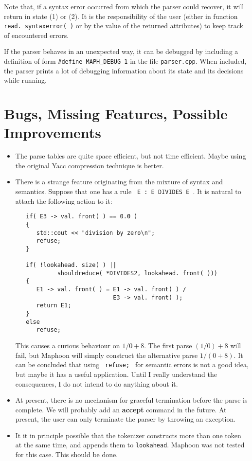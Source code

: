 \documentclass{article}
\begin{document}
\noindent
Note that, if a syntax error occurred from which the parser could
recover, it will return in state (1) or (2). It is the responsibility
of the user (either in function \verb+read. syntaxerror( )+ or by
the value of the returned attributes) to keep track
of encountered errors.

If the parser behaves in an unexpected way, it can be
debugged by including a definition of form
\verb+#define MAPH_DEBUG 1+ in the file
\verb+parser.cpp+. 
When included, the parser prints a lot of debugging information
about its state and its decisions while running.

\section{Bugs, Missing Features, Possible Improvements}

\begin{itemize}
\item  
   The parse tables are quite space efficient, but not time efficient.
   Maybe using the original Yacc compression technique is better.
\item
   There is a strange feature originating from the mixture of syntax
   and semantics. Suppose that one has a rule 
   \verb+ E : E DIVIDES E +. It is natural to attach the following
   action to it:

\begin{verbatim}
   if( E3 -> val. front( ) == 0.0 )
   {
      std::cout << "division by zero\n";
      refuse;
   }

   if( !lookahead. size( ) || 
            shouldreduce( *DIVIDES2, lookahead. front( )))
   {
      E1 -> val. front( ) = E1 -> val. front( ) / 
                            E3 -> val. front( );
      return E1;
   }
   else
      refuse;
\end{verbatim}

   \noindent
   This causes a curious behaviour on $ 1 / 0 + 8. $ 
   The first parse $ (1/0)+8 $ will fail, but Maphoon will simply construct
   the alternative parse $ 1 / ( 0 + 8 ). $ 
   It can be concluded that using \verb+ refuse; + for semantic errors is not
   a good idea, but maybe it has a useful application.
   Until I really understand the consequences, I do not intend to do 
   anything about it.

\item 
   At present, there is no mechanism for graceful termination before
   the parse is complete. We will probably add an {\bf accept} command in the
   future. At present, the user can only terminate the parser by 
   throwing an exception. 

\item
   It it in principle possible that the tokenizer constructs more than
   one token at the same time, and appends them to \verb+lookahead+.
   Maphoon was not tested for this case. This should be done. 

\end{itemize}
\end{document}
